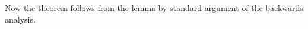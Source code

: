\documentclass[a4paper,USenglish]{socg-lipics-v2018}
\begin{document}
Now the theorem follows from the lemma by standard argument
of the backwards analysis.



\end{document}
